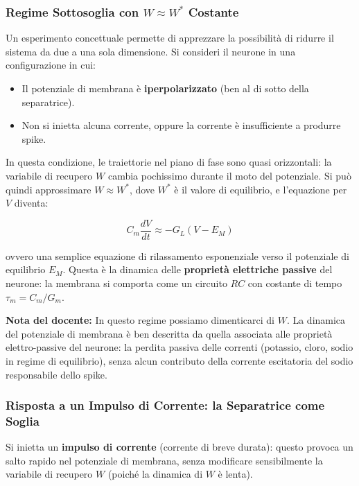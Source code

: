 \subsubsection{Regime Sottosoglia con $W \approx W^*$ Costante}

Un esperimento concettuale permette di apprezzare la possibilità di ridurre il sistema da due a una sola dimensione. Si consideri il neurone in una configurazione in cui:
\begin{itemize}
    \item Il potenziale di membrana è \textbf{iperpolarizzato} (ben al di sotto della separatrice).
    \item Non si inietta alcuna corrente, oppure la corrente è insufficiente a produrre spike.
\end{itemize}

In questa condizione, le traiettorie nel piano di fase sono quasi orizzontali: la variabile di recupero $W$ cambia pochissimo durante il moto del potenziale. Si può quindi approssimare $W \approx W^*$, dove $W^*$ è il valore di equilibrio, e l'equazione per $V$ diventa:

\begin{equation}
C_m \frac{dV}{dt} \approx -G_L(V - E_M)
\end{equation}

ovvero una semplice equazione di rilassamento esponenziale verso il potenziale di equilibrio $E_M$. Questa è la dinamica delle \textbf{proprietà elettriche passive} del neurone: la membrana si comporta come un circuito $RC$ con costante di tempo $\tau_m = C_m/G_m$.

\begin{tcolorbox}[colback=gray!5, colframe=gray!40, arc=2mm, boxrule=0.5pt]
\textbf{Nota del docente:} In questo regime possiamo dimenticarci di $W$. La dinamica del potenziale di membrana è ben descritta da quella associata alle proprietà elettro-passive del neurone: la perdita passiva delle correnti (potassio, cloro, sodio in regime di equilibrio), senza alcun contributo della corrente escitatoria del sodio responsabile dello spike.
\end{tcolorbox}

\subsubsection{Risposta a un Impulso di Corrente: la Separatrice come Soglia}

Si inietta un \textbf{impulso di corrente} (corrente di breve durata): questo provoca un salto rapido nel potenziale di membrana, senza modificare sensibilmente la variabile di recupero $W$ (poiché la dinamica di $W$ è lenta).

